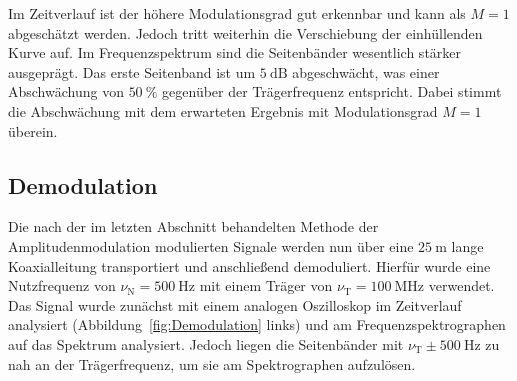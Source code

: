 \documentclass[a4paper,twoside,final]{article}
\begin{document}
Im Zeitverlauf ist der höhere Modulationsgrad gut erkennbar und kann als $M = 1$ abgeschätzt werden. Jedoch tritt weiterhin die Verschiebung der einhüllenden Kurve auf. Im Frequenzspektrum sind die Seitenbänder wesentlich stärker ausgeprägt. Das erste Seitenband ist um $\SI{5}{\deci\bel}$ abgeschwächt, was einer Abschwächung von $\SI{50}{\percent}$ gegenüber der Trägerfrequenz entspricht. Dabei stimmt die Abschwächung mit dem erwarteten Ergebnis mit Modulationsgrad $M =1$ überein.
\subsection{Demodulation}
Die nach der im letzten Abschnitt behandelten Methode der Amplitudenmodulation modulierten Signale werden nun über eine $\SI{25}{\metre}$ lange Koaxialleitung transportiert und anschließend demoduliert. Hierfür wurde eine Nutzfrequenz von $\nu_\text{N} =\SI{500}{\hertz}$ mit einem Träger von $\nu_\text{T}=\SI{100}{\mega\hertz}$ verwendet. Das Signal wurde zunächst mit einem analogen Oszilloskop im Zeitverlauf analysiert (Abbildung~\ref{fig:Demodulation} links) und am Frequenzspektrographen auf das Spektrum analysiert. Jedoch liegen die Seitenbänder mit $\nu_\text{T}\pm\SI{500}{\hertz}$ zu nah an der Trägerfrequenz, um sie am Spektrographen aufzulösen.
\end{document}
